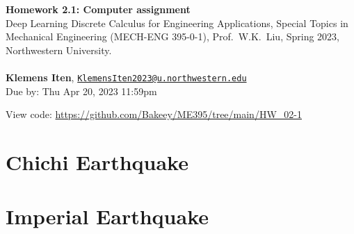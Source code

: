 \documentclass[letterpaper, 12pt]{article}
\begin{document}
\large\textbf{Homework 2.1: Computer assignment} \\  
\normalsize Deep Learning Discrete Calculus for Engineering Applications, Special Topics in Mechanical Engineering (MECH-ENG 395-0-1), Prof.~W.K.~Liu, Spring 2023, Northwestern University.
\\ \\
\textbf{Klemens Iten}, \href{mailto:KlemensIten2023@u.northwestern.edu}{\texttt{KlemensIten2023@u.northwestern.edu}}\\
\normalsize   Due by: Thu Apr 20, 2023 11:59pm

\normalsize   View code: \url{https://github.com/Bakeey/ME395/tree/main/HW_02-1}


\section*{Chichi Earthquake}


\section*{Imperial Earthquake}


% 
\newpage
\small

\end{document}
